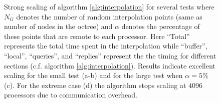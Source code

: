\begin{figure}[htbp]
\begin{center}
	\end{center}
	\caption{Strong scaling of algorithm \ref{alg:interpolation} for several tests where $N_G$ denotes the number of random interpolation points (same as number of nodes in the octree) and $\alpha$ denotes the percentage of these points that are remote to each processor. Here ``Total'' represents the total time spent in the interpolation while ``buffer'', ``local'', ``queries'', and ``replies'' represent the the timing for different sections (c.f. algorithm \ref{alg:interpolation}). Results indicate excellent scaling for the small test (a-b) and for the large test when $\alpha = 5\%$ (c). For the extreme case (d) the algorithm stops scaling at $4096$ processors due to communication overhead.}
	\label{fig:interpolation}
\end{figure}

